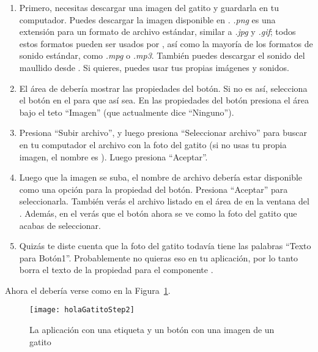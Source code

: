 \begin{enumerate}

\item Primero, necesitas descargar una imagen del gatito y guardarla en tu computador. Puedes descargar la imagen disponible en . \emph{.png} es una extensión para un formato de archivo estándar, similar a \emph{.jpg} y \emph{.gif}; todos estos formatos pueden ser usados por \AppInventor, así como la mayoría de los formatos de sonido estándar, como \emph{.mpg} o \emph{.mp3}. También puedes descargar el sonido del maullido desde . Si quieres, puedes usar tus propias imágenes y sonidos.

\item El área de \properties debería mostrar las propiedades del botón. Si no es así, selecciona el botón en el \viewer para que así sea. En las propiedades del botón presiona el área bajo el teto ``Imagen'' (que actualmente dice ``Ninguno'').

\item Presiona ``Subir archivo'', y luego presiona ``Seleccionar archivo'' para buscar en tu computador el archivo con la foto del gatito (si no usas tu propia imagen, el nombre es ). Luego presiona ``Aceptar''.

\item Luego que la imagen se suba, el nombre de archivo debería estar disponible como una opción para la propiedad  del botón. Presiona ``Aceptar'' para seleccionarla. También verás el archivo listado en el área de \media en la ventana del \designer. Además, en el \designer verás que el botón ahora se ve como la foto del gatito que acabas de seleccionar.

\item Quizás te diste cuenta que la foto del gatito todavía tiene las palabras ``Texto para Botón1''. Probablemente no quieras eso en tu aplicación, por lo tanto borra el texto de la propiedad  para el componente .

\end{enumerate}

Ahora el \designer debería verse como en la Figura~\ref{fig:holaGatitoStep2}.

\begin{figure}[H]
  \centering
  \texttt{[image: holaGatitoStep2]}
  \caption{La aplicación con una etiqueta y un botón con una imagen de un gatito}
  \label{fig:holaGatitoStep2}
\end{figure}

